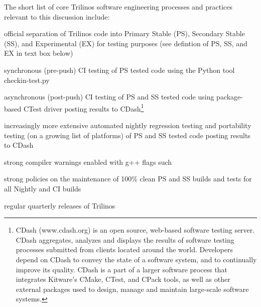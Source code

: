 \documentclass[11pt]{SANDreport}
\begin{document}
The short list of core Trilinos software engineering processes and
practices relevant to this discussion include:

\begin{compactitem}

{}\item official separation of Trilinos code into Primary Stable (PS),
Secondary Stable (SS), and Experimental (EX) for testing purposes (see
defintion of PS, SS, and EX in text box below)

{}\item synchronous (pre-push) CI testing of PS tested code using the
Python tool checkin-test.py

{}\item asynchronous (post-push) CI testing of PS and SS tested code
using package-based CTest driver posting results to
CDash\footnote{CDash (www.cdash.org) is an open source, web-based
software testing server. CDash aggregates, analyzes and displays the
results of software testing processes submitted from clients located
around the world. Developers depend on CDash to convey the state of a
software system, and to continually improve its quality. CDash is a
part of a larger software process that integrates Kitware's CMake,
CTest, and CPack tools, as well as other external packages used to
design, manage and maintain large-scale software systems.}

{}\item increasingly more extensive automated nightly regression
testing and portability testing (on a growing list of platforms) of PS
and SS tested code posting results to CDash

{}\item strong compiler warnings enabled with g++ flags such
{}

{}\item strong policies on the maintenance of 100\% clean PS and SS
builds and tests for all Nightly and CI builds

{}\item regular quarterly releases of Trilinos

\end{compactitem}
\end{document}
